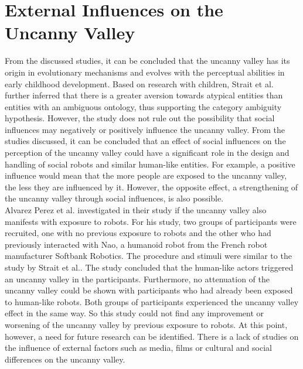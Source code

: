 \section{External Influences on the Uncanny Valley}
From the discussed studies, it can be concluded that the uncanny valley has its origin in evolutionary mechanisms and evolves with the perceptual abilities in early childhood development. Based on research with children, Strait et al. \cite{childrens_responding} further inferred that there is a greater aversion towards atypical entities than entities with an ambiguous ontology, thus supporting the category ambiguity hypothesis. However, the study does not rule out the possibility that social influences may negatively or positively influence the uncanny valley. From the studies discussed, it can be concluded that an effect of social influences on the perception of the uncanny valley could have a significant role in the design and handling of social robots and similar human-like entities. For example, a positive influence would mean that the more people are exposed to the uncanny valley, the less they are influenced by it. However, the opposite effect, a strengthening of the uncanny valley through social influences, is also possible.\\
Alvarez Perez et al. \cite{prior_exposure_robots} investigated in their study if the uncanny valley also manifests with exposure to robots. For his study, two groups of participants were recruited, one with no previous exposure to robots and the other who had previously interacted with Nao, a humanoid robot from the French robot manufacturer Softbank Robotics. The procedure and stimuli were similar to the study by Strait et al.. The study concluded that the human-like actors triggered an uncanny valley in the participants. Furthermore, no attenuation of the uncanny valley could be shown with participants who had already been exposed to human-like robots. Both groups of participants experienced the uncanny valley effect in the same way. So this study could not find any improvement or worsening of the uncanny valley by previous exposure to robots. At this point, however, a need for future research can be identified. There is a lack of studies on the influence of external factors such as media, films or cultural and social differences on the uncanny valley.